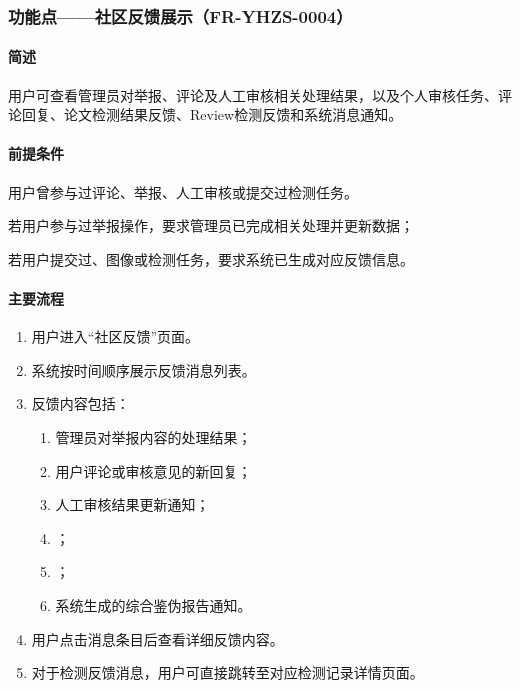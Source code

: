 \subsubsection{功能点——社区反馈展示（FR-YHZS-0004）}

\paragraph*{简述}

用户可查看管理员对举报、评论及人工审核相关处理结果，以及个人审核任务、评论回复、论文检测结果反馈、Review检测反馈和系统消息通知。

\paragraph*{前提条件}

用户曾参与过评论、举报、人工审核或提交过检测任务。

若用户参与过举报操作，要求管理员已完成相关处理并更新数据；

若用户提交过、图像或检测任务，要求系统已生成对应反馈信息。

\paragraph*{主要流程}

\begin{enumerate}
    \item 用户进入“社区反馈”页面。
    \item 系统按时间顺序展示反馈消息列表。
    \item 反馈内容包括：
    \begin{enumerate}
        \item 管理员对举报内容的处理结果；
        \item 用户评论或审核意见的新回复；
        \item 人工审核结果更新通知；
        \item {}；
        \item {}；
        \item 系统生成的综合鉴伪报告通知。
    \end{enumerate}
    \item 用户点击消息条目后查看详细反馈内容。
    \item 对于检测反馈消息，用户可直接跳转至对应检测记录详情页面。
\end{enumerate}

